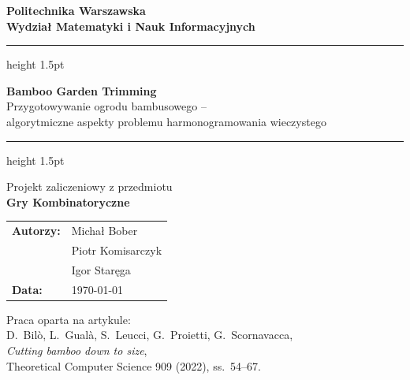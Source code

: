 \documentclass[12pt,a4paper]{article}
\theoremstyle{plain}
\theoremstyle{definition}
\theoremstyle{remark}
\begin{document}
\begin{titlepage}
  \centering
  \vspace*{1.5cm}

  {\Large\bfseries Politechnika Warszawska\\[0.3em]
  Wydział Matematyki i Nauk Informacyjnych}

  \vspace{1.2cm}
  \hrule height 1.5pt
  \vspace{0.6cm}

  {\LARGE\bfseries Bamboo Garden Trimming}\\[0.5em]
  {\large Przygotowywanie ogrodu bambusowego –\\
  algorytmiczne aspekty problemu harmonogramowania wieczystego}

  \vspace{0.6cm}
  \hrule height 1.5pt
  \vspace{1.5cm}

  {\large Projekt zaliczeniowy z przedmiotu}\\[0.3em]
  {\large\bfseries Gry Kombinatoryczne}

  \vspace{2cm}

  \begin{tabular}{ll}
    \textbf{Autorzy:}   & Michał Bober \\
                        & Piotr Komisarczyk \\
                        & Igor Staręga \\[0.8em]
    \textbf{Data:}      & \today
  \end{tabular}

  \vfill

  \begin{center}
    \small Praca oparta na artykule:\\
    D.~Bilò, L.~Gualà, S.~Leucci, G.~Proietti, G.~Scornavacca,\\
    \textit{Cutting bamboo down to size},\\
    Theoretical Computer Science 909 (2022), ss.~54–67.
  \end{center}
\end{titlepage}
\end{document}
